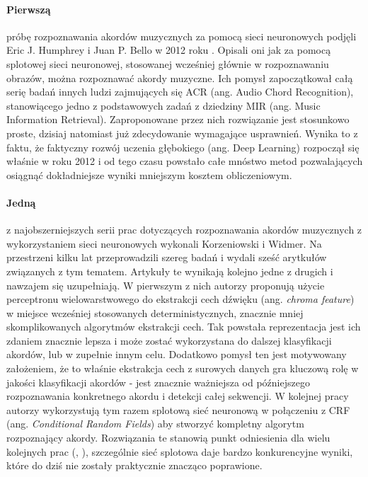\paragraph{Pierwszą} próbę rozpoznawania akordów muzycznych za pomocą sieci neuronowych podjęli Eric J. Humphrey i Juan P. Bello w 2012 roku \cite{humphrey_rethinking_2012}. Opisali oni jak za pomocą splotowej sieci neuronowej, stosowanej wcześniej głównie w rozpoznawaniu obrazów, można rozpoznawać akordy muzyczne. Ich pomysł zapoczątkował całą serię badań innych ludzi zajmujących się ACR (ang.  Audio Chord Recognition), stanowiącego jedno z podstawowych zadań z dziedziny MIR (ang. Music Information Retrieval). Zaproponowane przez nich rozwiązanie jest stosunkowo proste, dzisiaj natomiast już zdecydowanie wymagające usprawnień. Wynika to z faktu, że faktyczny rozwój uczenia głębokiego (ang. Deep Learning) rozpoczął się właśnie w roku 2012 i od tego czasu powstało całe mnóstwo metod pozwalających osiągnąć dokładniejsze wyniki mniejszym kosztem obliczeniowym.

\paragraph{Jedną} z najobszerniejszych serii prac dotyczących rozpoznawania akordów muzycznych z wykorzystaniem sieci neuronowych wykonali Korzeniowski i Widmer. Na przestrzeni kilku lat przeprowadzili szereg badań i wydali sześć arytkułów związanych z tym tematem. Artykuły te wynikają kolejno jedne z drugich i nawzajem się uzupełniają. W pierwszym z nich \cite{korzeniowski_feature_2016} autorzy proponują użycie perceptronu wielowarstwowego do ekstrakcji cech dźwięku (ang. \emph{chroma feature}) w miejsce wcześniej stosowanych deterministycznych, znacznie mniej skomplikowanych algorytmów ekstrakcji cech. Tak powstała reprezentacja jest ich zdaniem znacznie lepsza i może zostać wykorzystana do dalszej klasyfikacji akordów, lub w zupełnie innym celu. Dodatkowo pomysł ten jest motywowany założeniem, że to właśnie ekstrakcja cech z surowych danych gra kluczową rolę w jakości klasyfikacji akordów - jest znacznie ważniejsza od późniejszego rozpoznawania konkretnego akordu i detekcji całej sekwencji. W kolejnej pracy \cite{korzeniowski_fully_2016} autorzy wykorzystują tym razem splotową sieć neuronową w połączeniu z CRF (ang. \emph{Conditional Random Fields}) aby stworzyć kompletny algorytm rozpoznający akordy. Rozwiązania te stanowią punkt odniesienia dla wielu kolejnych prac (\cite{ohanlon_fifthnet_2021}, \cite{park_bi-directional_2019}), szczególnie sieć splotowa \cite{korzeniowski_fully_2016} daje bardzo konkurencyjne wyniki, które do dziś nie zostały praktycznie znacząco poprawione.

